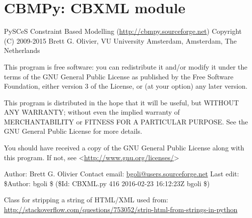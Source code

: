 \documentclass[a4paper,11pt,english]{sphinxmanual}
\begin{document}
\label{modules_doc:module-cbmpy.CBXML}

\section{CBMPy: CBXML module}
\label{modules_doc:cbmpy-cbxml-module}
PySCeS Constraint Based Modelling (\href{http://cbmpy.sourceforge.net}{http://cbmpy.sourceforge.net})
Copyright (C) 2009-2015 Brett G. Olivier, VU University Amsterdam, Amsterdam, The Netherlands

This program is free software: you can redistribute it and/or modify
it under the terms of the GNU General Public License as published by
the Free Software Foundation, either version 3 of the License, or
(at your option) any later version.

This program is distributed in the hope that it will be useful,
but WITHOUT ANY WARRANTY; without even the implied warranty of
MERCHANTABILITY or FITNESS FOR A PARTICULAR PURPOSE.  See the
GNU General Public License for more details.

You should have received a copy of the GNU General Public License
along with this program.  If not, see \textless{}\href{http://www.gnu.org/licenses/}{http://www.gnu.org/licenses/}\textgreater{}

Author: Brett G. Olivier
Contact email: \href{mailto:bgoli@users.sourceforge.net}{bgoli@users.sourceforge.net}
Last edit: \$Author: bgoli \$ (\$Id: CBXML.py 416 2016-02-23 16:12:23Z bgoli \$)

\begin{fulllineitems}
\label{modules_doc:cbmpy.CBXML.MLStripper}
Class for stripping a string of HTML/XML used from:
\href{http://stackoverflow.com/questions/753052/strip-html-from-strings-in-python}{http://stackoverflow.com/questions/753052/strip-html-from-strings-in-python}

\end{fulllineitems}

\end{document}
